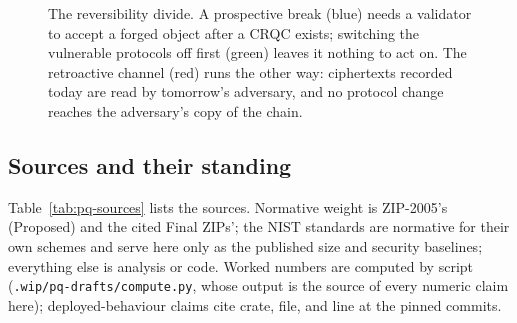 \documentclass[11pt,a4paper]{article}
\theoremstyle{definition}
\begin{document}
\begin{figure}[ht]
\centering
{}
\caption{The reversibility divide. A prospective break (blue) needs a
validator to accept a forged object after a CRQC exists; switching the
vulnerable protocols off first (green) leaves it nothing to act on. The
retroactive channel (red) runs the other way: ciphertexts recorded today
are read by tomorrow's adversary, and no protocol change reaches the
adversary's copy of the chain.}
\label{fig:pq-axis}
\end{figure}

\subsection{Sources and their standing}\label{sec:pq-sources}

Table~\ref{tab:pq-sources} lists the sources. Normative weight is
ZIP-2005's (Proposed) and the cited Final ZIPs'; the NIST standards are
normative for their own schemes and serve here only as the published
size and security baselines; everything else is analysis or code.
Worked numbers are computed by script
(\texttt{.wip/pq-drafts/compute.py}, whose output is the source of
every numeric claim here); deployed-behaviour claims cite crate, file,
and line at the pinned commits.
\end{document}
